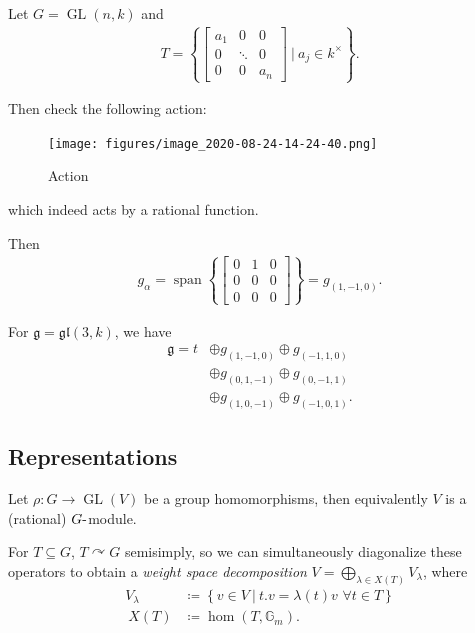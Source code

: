 \begin{example}

Let \(G = \operatorname{GL}(n, k)\) and
\begin{align*}  
T = \left\{{
\begin{bmatrix}
a_1 & 0 & 0 \\
0 & \ddots & 0 \\
0 & 0 & a_n
\end{bmatrix}
{~\mathrel{\Big|}~}a_j\in k^{\times}
}\right\}
.\end{align*}

Then check the following action:

\begin{figure}
\centering
\texttt{[image: figures/image\_2020-08-24-14-24-40.png]}
\caption{Action}
\end{figure}

which indeed acts by a rational function.

Then
\begin{align*}  
g_\alpha = {\operatorname{span}}\left\{{
\begin{bmatrix}
0 & 1 & 0 \\
0 & 0 & 0\\
0 & 0 & 0
\end{bmatrix}
}\right\} = g_{(1, -1, 0)}
.\end{align*}

For \({\mathfrak{g}}= {\mathfrak{gl}}(3, k)\), we have
\begin{align*}  
{\mathfrak{g}}= t 
&\oplus g_{(1, -1, 0)}
\oplus g_{(-1, 1, 0)}  \\
&\oplus g_{(0, 1, -1)} 
\oplus g_{(0, -1, 1)}  \\
&\oplus g_{(1, 0, -1)} 
\oplus g_{(-1, 0, 1)} 
.\end{align*}

\end{example}

\hypertarget{representations}{%
\subsection{Representations}\label{representations}}

Let \(\rho: G\to \operatorname{GL}(V)\) be a group homomorphisms, then
equivalently \(V\) is a (rational) \(G{\hbox{-}}\)module.

For \(T\subseteq G\), \(T\curvearrowright G\) semisimply, so we can
simultaneously diagonalize these operators to obtain a \emph{weight
space decomposition} \(V = \bigoplus_{\lambda \in X(T)} V_\lambda\),
where
\begin{align*}  
V_\lambda &\coloneqq\left\{{v\in V{~\mathrel{\Big|}~}t.v = \lambda(t)v\,\, \forall t\in T}\right\} \\\
X(T) &\coloneqq\hom(T, {\mathbb{G}}_m)
.\end{align*}

